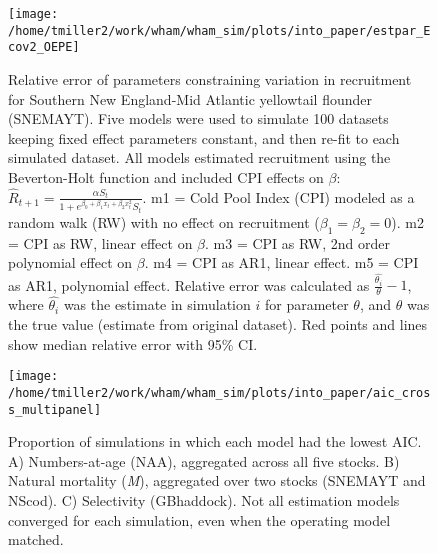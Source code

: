 \documentclass[]{article}
\begin{document}
\begin{landscape}
\begin{figure}

{\centering \texttt{[image: /home/tmiller2/work/wham/wham\_sim/plots/into\_paper/estpar\_Ecov2\_OEPE]} 

}

\caption{Relative error of parameters constraining variation in recruitment for Southern New England-Mid Atlantic yellowtail flounder (SNEMAYT). Five models were used to simulate 100 datasets keeping fixed effect parameters constant, and then re-fit to each simulated dataset. All models estimated recruitment using the Beverton-Holt function and included CPI effects on $\beta$: $\hat{R}_{t+1} = \frac{\alpha S_{t}}{1 + e^{\beta_0 + \beta_1 x_{t} + \beta_2 x^2_{t}} S_t}$. m1 = Cold Pool Index (CPI) modeled as a random walk (RW) with no effect on recruitment ($\beta_1 = \beta_2 = 0$). m2 = CPI as RW, linear effect on $\beta$. m3 = CPI as RW, 2nd order polynomial effect on $\beta$. m4 = CPI as AR1, linear effect. m5 = CPI as AR1, polynomial effect. Relative error was calculated as $\frac{\hat{\theta_i}}{\theta} - 1$, where $\hat{\theta_i}$ was the estimate in simulation $i$ for parameter $\theta$, and $\theta$ was the true value (estimate from original dataset). Red points and lines show median relative error with 95\% CI.}\label{fig:estpar-ecov}
\end{figure}
\end{landscape}

\pagebreak

\begin{figure}

{\centering \texttt{[image: /home/tmiller2/work/wham/wham\_sim/plots/into\_paper/aic\_cross\_multipanel]} 

}

\caption{Proportion of simulations in which each model had the lowest AIC. A) Numbers-at-age (NAA), aggregated across all five stocks. B) Natural mortality (\textit{M}), aggregated over two stocks (SNEMAYT and NScod). C) Selectivity (GBhaddock). Not all estimation models converged for each simulation, even when the operating model matched.}\label{fig:aic-cross}
\end{figure}
\end{document}
